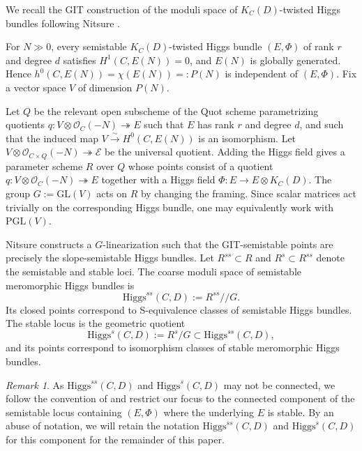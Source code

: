 \documentclass[11pt]{amsart}
\theoremstyle{plain}
\theoremstyle{definition}
\theoremstyle{remark}
\newtheorem{rem}[theorem]{Remark}
\newcommand{\GL}{\mathrm{GL}}
\newcommand{\cO}{\mathcal O}
\newcommand{\Higgs}{\mathrm{Higgs}}
\begin{document}
We recall the GIT construction of the moduli space of $K_C(D)$-twisted Higgs bundles following Nitsure \cite{Nitsure1991curve}.

For $N\gg 0$, every semistable $K_C(D)$-twisted Higgs bundle $(E,\Phi)$ of rank $r$ and degree $d$ satisfies $H^1(C,E(N))=0$, and $E(N)$ is globally generated. Hence
$h^0(C,E(N))=\chi(E(N))=:P(N)$
is independent of $(E,\Phi)$. Fix a vector space $V$ of dimension $P(N)$.

Let $Q$ be the relevant open subscheme of the Quot scheme parametrizing quotients
$q:V\otimes\cO_C(-N)\twoheadrightarrow E$
such that $E$ has rank $r$ and degree $d$, and such that the induced map
$V\xrightarrow{\sim}H^0(C,E(N))$ is an isomorphism. Let
$V\otimes\cO_{C\times Q}(-N)\twoheadrightarrow\mathcal E$
be the universal quotient. Adding the Higgs field gives a parameter scheme $R$ over $Q$ whose points consist of a quotient
$q:V\otimes\cO_C(-N)\twoheadrightarrow E$
together with a Higgs field
$\Phi:E\to E\otimes K_C(D)$.
The group $G:=\GL(V)$ acts on $R$ by changing the framing.  Since scalar matrices act trivially on the corresponding Higgs bundle, one may equivalently work with $\mathrm{PGL}(V)$.

Nitsure constructs a $G$-linearization such that the GIT-semistable points are precisely the slope-semistable Higgs bundles. Let $R^{ss}\subset R$ and $R^s\subset R^{ss}$ denote the semistable and stable loci. The coarse moduli space of semistable meromorphic Higgs bundles is
\[
\Higgs^{ss}(C,D):=R^{ss}//G.
\]
Its closed points correspond to S-equivalence classes of semistable Higgs bundles. The stable locus is the geometric quotient
\[
\Higgs^s(C,D):=R^s/G\subset\Higgs^{ss}(C,D),
\]
and its points correspond to isomorphism classes of stable meromorphic Higgs bundles. 

\begin{rem}As $\Higgs^{ss}(C,D)$ and $\Higgs^s(C,D)$ may not be connected, we follow the convention of \cite{Bottacin1995symplectic,markmanspectral} and restrict our focus to the connected component of the semistable locus containing $(E, \Phi)$ where the underlying $E$ is stable. By an abuse of notation, we will retain the notation $\Higgs^{ss}(C, D)$ and $\Higgs^{s}(C, D)$ for this component for the remainder of this paper. 
\end{rem}
\end{document}

